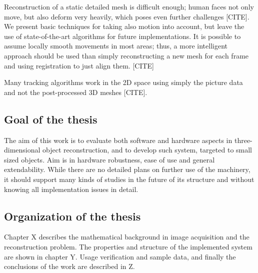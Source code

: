 Reconstruction of a static detailed mesh is difficult enough; human faces not only move, but also deform very heavily, which poses even further challenges [CITE].
We present basic techniques for taking also motion into account, but leave the use of state-of-the-art algorithms for future implementations.
It is possible to assume locally smooth movements in most areas; thus, a more intelligent approach should be used than simply reconstructing a new mesh for each frame and using registration to just align them. [CITE]

Many tracking algorithms work in the 2D space using simply the picture data and not the post-processed 3D meshes [CITE].


\subsection{Goal of the thesis}

The aim of this work is to evaluate both software and hardware aspects in three-dimensional object reconstruction, and to develop such system, targeted to small sized objects.
Aim is in hardware robustness, ease of use and general extendability. While there are no detailed plans on further use of the machinery, it should support many kinds of studies in the future of its structure and without knowing all implementation issues in detail.

\subsection{Organization of the thesis}

Chapter X describes the mathematical background in image acquisition and the reconstruction problem.
The properties and structure of the implemented system are shown in chapter Y.
Usage verification and sample data, and finally the conclusions of the work are described in Z.
